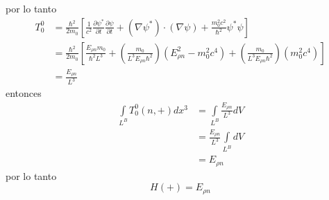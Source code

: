 por lo tanto
\begin{align*}
    T_0^0 &= \frac{\hbar^2}{2m_0} \left[\frac{1}{c^2} \frac{\partial \psi^*}{\partial t}\frac{\partial \psi}{\partial t}+ \left(\nabla \psi^*\right)\cdot \left(\nabla \psi \right)+ \frac{m_0^2c^2}{\hbar^2} \psi^* \psi \right]  \\
    &= \frac{\hbar^2}{2m_0} \left[\frac{E_{\rho n}m_0}{\hbar^2 L^3} + \left(\frac{m_0}{L^3 E_{\rho n }\hbar^2}\right) (E_{\rho n}^2-m_0^2c^4)+\left(\frac{m_0}{L^3 E_{\rho n }\hbar^2}\right)(m_0^2c^4)\right]\\
    & = \frac{E_{\rho n}}{L^3}
\end{align*}
entonces
\begin{align*}
    \int\limits_{L^B}   T_0^0(n,+) dx^3 &= \int\limits_{L^B}  \frac{E_{\rho n}}{L^3} dV \\
    &= \frac{E_{\rho n}}{L^3} \int\limits_{L^B} dV \\
    &= E_{\rho n}
\end{align*}
por lo tanto
\begin{equation*}
    H(+)= E_{\rho n}
\end{equation*}


